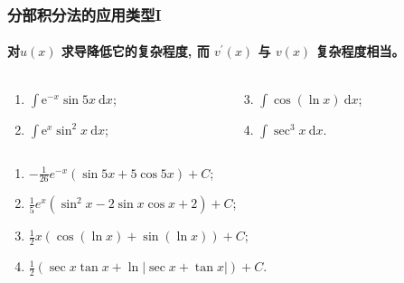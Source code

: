 \documentclass[
10pt,
aspectratio=43,
]{beamer}
\begin{document}
\begin{frame}
	\frametitle{分部积分法的应用类型I}
	\framesubtitle{对$u(x)$ 求导降低它的复杂程度, 而 $v^{\prime}(x)$ 与 $v(x)$ 复杂程度相当。}
	\everymath{\displaystyle}
	\begin{block}{}
		\begin{columns}[onlytextwidth]
			\begin{column}{0.5\textwidth}
				\begin{enumerate}
					\item $\int \mathrm{e}^{-x} \sin 5 x \mathrm{~d} x$;
					\item $\int \mathrm{e}^x \sin ^2 x \mathrm{~d} x$;
				\end{enumerate}
			\end{column}
			\begin{column}{0.5\textwidth}
				\begin{enumerate}
					\setcounter{enumi}{2}
					\item $\int \cos (\ln x) \mathrm{~d} x$;
					\item $\int \sec ^3 x \mathrm{~d} x$.
				\end{enumerate}
			\end{column}
		\end{columns}
	\end{block}
	\begin{exampleblock}{}
		\begin{enumerate}
			\item $-\frac{1}{26}e^{-x}\left(\sin 5x +5\cos 5x\right)+C$;
			\item $\frac{1}{5}e^{x}\left(\sin^2x -2\sin x\cos x+2\right)+C$;
			\item $\frac12x\left(\cos(\ln x)+\sin(\ln x)\right)+C$;
			\item $\frac{1}{2}(\sec x \tan x+\ln |\sec x+\tan x|)+C$.
		\end{enumerate}
	\end{exampleblock}
\end{frame}
\end{document}
